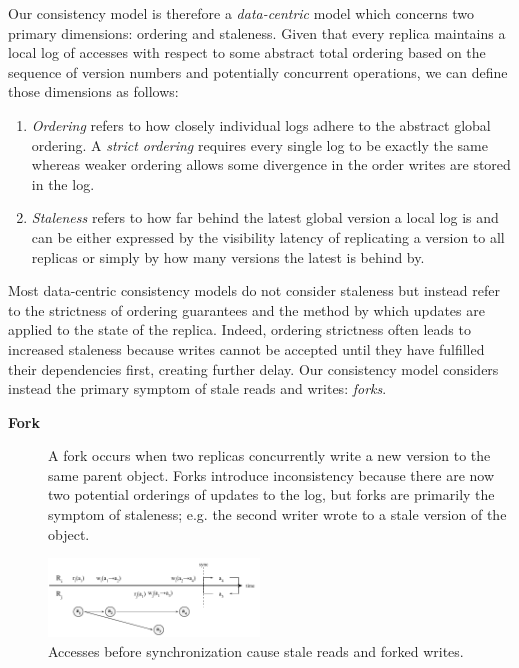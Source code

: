 \documentclass[10pt,conference,compsocconf,letterpaper]{IEEEtran}
\begin{document}
Our consistency model is therefore a \textit{data-centric} model which concerns two primary dimensions: ordering and staleness. Given that every replica maintains a local log of accesses with respect to some abstract total ordering based on the sequence of version numbers and potentially concurrent operations, we can define those dimensions as follows:

\begin{enumerate}
    \item \textit{Ordering} refers to how closely individual logs adhere to the abstract global ordering. A \textit{strict ordering} requires every single log to be exactly the same whereas weaker ordering allows some divergence in the order writes are stored in the log.
    \item \textit{Staleness} refers to how far behind the latest global version a local log is and can be either expressed by the visibility latency of replicating a version to all replicas or simply by how many versions the latest is behind by.
\end{enumerate}

Most data-centric consistency models do not consider staleness but instead refer to the strictness of ordering guarantees and the method by which updates are applied to the state of the replica. Indeed, ordering strictness often leads to increased staleness because writes cannot be accepted until they have fulfilled their dependencies first, creating further delay. Our consistency model considers instead the primary symptom of stale reads and writes: \textit{forks}.

\begin{description}
    \item[\textbf{Fork}] A fork occurs when two replicas concurrently write a new version to the same parent object. Forks introduce inconsistency because there are now two potential orderings of updates to the log, but forks are primarily the symptom of staleness; e.g. the second writer wrote to a stale version of the object.
\end{description}

\begin{figure}[t]
    \centering
    \includegraphics[width=0.5\textwidth]{figures/forks}
    \caption{Accesses before synchronization cause stale reads and forked writes.}
    \label{fig:forks}
\end{figure}
\end{document}
